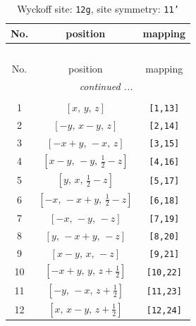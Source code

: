 \documentclass[fleqn,8pt]{jsarticle}
\begin{document}
\renewcommand{\arraystretch}{1.2}
\begin{longtable}{ccc}
\caption{Wyckoff site: {\tt 12g}, site symmetry: {\tt 11'}}
 \\
 \hline \hline
No. & position & mapping \\ \hline \endfirsthead

\multicolumn{2}{l}{\tablename\ \thetable{}} \\
 \hline \hline
No. & position & mapping \\ \hline \endhead

 \hline \hline
\multicolumn{2}{r}{\footnotesize\it continued ...} \\ \endfoot

 \hline \hline
\multicolumn{2}{r}{} \\ \endlastfoot

1 & $\left[ x,\, y,\, z \right]$ & {\tt [1,13]} \\ \hline
2 & $\left[ - y,\, x - y,\, z \right]$ & {\tt [2,14]} \\ \hline
3 & $\left[ - x + y,\, - x,\, z \right]$ & {\tt [3,15]} \\ \hline
4 & $\left[ x - y,\, - y,\, \frac{1}{2} - z \right]$ & {\tt [4,16]} \\ \hline
5 & $\left[ y,\, x,\, \frac{1}{2} - z \right]$ & {\tt [5,17]} \\ \hline
6 & $\left[ - x,\, - x + y,\, \frac{1}{2} - z \right]$ & {\tt [6,18]} \\ \hline
7 & $\left[ - x,\, - y,\, - z \right]$ & {\tt [7,19]} \\ \hline
8 & $\left[ y,\, - x + y,\, - z \right]$ & {\tt [8,20]} \\ \hline
9 & $\left[ x - y,\, x,\, - z \right]$ & {\tt [9,21]} \\ \hline
10 & $\left[ - x + y,\, y,\, z + \frac{1}{2} \right]$ & {\tt [10,22]} \\ \hline
11 & $\left[ - y,\, - x,\, z + \frac{1}{2} \right]$ & {\tt [11,23]} \\ \hline
12 & $\left[ x,\, x - y,\, z + \frac{1}{2} \right]$ & {\tt [12,24]} \\
\end{longtable}
\end{document}
